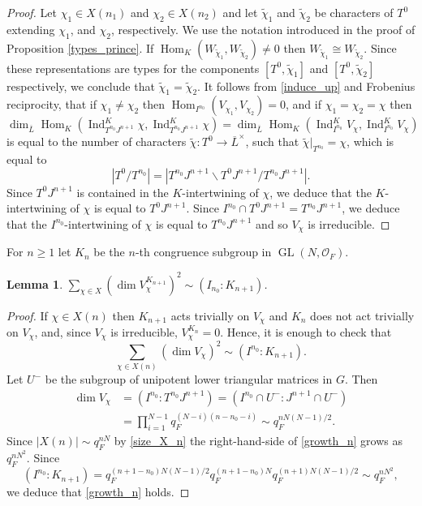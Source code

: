 \documentclass[JEP,XML,SOM,Unicode,NoEqCountersInSection]{cedram}
\let\mathcal\mathscr
\newtheorem{lem}[prop]{Lemma}
\theoremstyle{definition}
\DeclareMathOperator{\Hom}{Hom}
\DeclareMathOperator{\Ind}{Ind}
\DeclareMathOperator{\GL}{GL}
\newcommand{\Indu}[3]{\Ind_{#1}^{#2}{#3}}
\newcommand{\cO}{\mathcal{O}}
\newcommand{\Lbar}{\overline{L}}
\begin{document}
\begin{proof} Let $\chi_1\in X(n_1)$ and $\chi_2\in X(n_2)$ and let $\tilde{\chi}_1$ and $\tilde{\chi}_2$ be characters of $T^0$ extending $\chi_1$, and $\chi_2$, respectively.
We use the notation introduced in the proof of Proposition \ref{types_prince}. If $\Hom_K(W_{\tilde{\chi}_1}, W_{\tilde{\chi}_2})\neq 0$ then $W_{\tilde{\chi}_1}\cong W_{\tilde{\chi}_2}$.
Since these representations are types for the components $[T^0, \tilde{\chi}_1]$ and
$[T^0, \tilde{\chi}_2]$ respectively, we conclude that $\tilde{\chi}_1=\tilde{\chi}_2$. It follows from
\eqref{induce_up} and Frobenius reciprocity, that if $\chi_1\neq \chi_2$ then $\Hom_{I^{n_0}}(V_{\chi_1}, V_{\chi_2})=0$, and if $\chi_1=\chi_2=\chi$ then
\[
\dim_{\Lbar}\Hom_K( \Indu{T^{n_0}J^{n+1}}{K}{\chi}, \Indu{T^{n_0}J^{n+1}}{K}{\chi})= \dim_{\Lbar} \Hom_K( \Indu{I^{n_0}}{K}{V_\chi}, \Indu{I^{n_0}}{K}{V_\chi})
\]
is equal to the number of characters $\tilde{\chi}: T^0\to \Lbar^{\times}$, such that $\tilde{\chi}|_{T^{n_0}}= \chi$, which is equal to
\[
| T^0/ T^{n_0}|=|T^{n_0} J^{n+1}\backslash T^{0} J^{n+1} / T^{n_0} J^{n+1}|.
\]
Since $T^0 J^{n+1}$ is contained in the $K$-intertwining of $\chi$, we deduce that the $K$\nobreakdash-inter\-twining of $\chi$ is equal to $T^0 J^{n+1}$. Since $I^{n_0} \cap T^0 J^{n+1}= T^{n_0} J^{n+1}$,
we deduce that the $I^{n_0}$-intertwining of $\chi$ is equal to $T^{n_0} J^{n+1}$ and so $V_{\chi}$ is irreducible.
\end{proof}

For $n\ge 1$ let $K_n$ be the $n$-th congruence subgroup in $\GL(N, \cO_F)$.
\begin{lem}\label{asymptotic_prince}
$\sum_{\chi\in X} (\dim V_{\chi}^{K_{n+1}})^2 \sim (I_{n_0}: K_{n+1})$.
\end{lem}

\begin{proof}
If $\chi\in X(n)$ then $K_{n+1}$ acts trivially on $V_{\chi}$ and $K_n$ does not act trivially on $V_{\chi}$, and, since $V_{\chi}$ is irreducible, $V_{\chi}^{K_n}=0$. Hence, it is enough to check that
\begin{equation}\label{growth_n}
\sum_{\chi\in X(n)} (\dim V_{\chi})^2 \sim (I^{n_0}: K_{n+1}).
\end{equation}
Let $U^-$ be the subgroup of unipotent lower triangular matrices in $G$. Then
\begin{equation} \label{dim_V_chi}
\begin{split}
\dim V_{\chi}&= ( I^{n_0}: T^{n_0} J^{n+1})= (I^{n_0}\cap U^-: J^{n+1} \cap U^-)\\
& = \prod_{i=1}^{N-1} q_F^{(N-i)(n-n_0-i)}\sim q_F^{n N(N-1)/2}.
\end{split}
\end{equation}
Since $|X(n)|\sim q_F^{nN}$ by \eqref{size_X_n} the right-hand-side of \eqref{growth_n} grows as $q_F^{n N^2}$. Since
\begin{equation} \label{index}
(I^{n_0}: K_{n+1})= q_F^{(n+1 -n_0) N(N-1)/2} q_F^{(n+1-n_0) N} q_F^{(n+1)N(N-1)/2}\sim q_F^{n N^2},
\end{equation}
we deduce that \eqref{growth_n} holds.
\end{proof}
\end{document}
